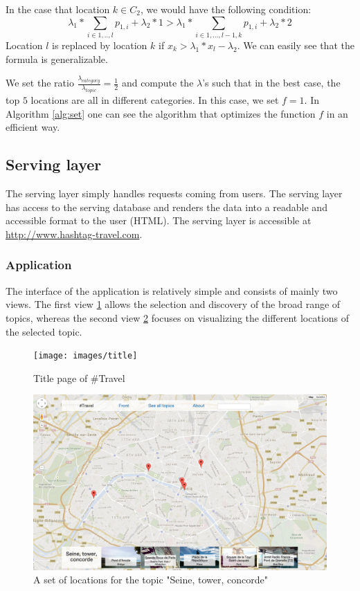 In the case that location $k \in C_2$, we would have the following condition:
\[
  \lambda_1 * \sum_{i \in 1,..,l}{p_{1,i}} + \lambda_2 * 1 > \lambda_1 * \sum_{i \in 1,...,l-1,k}{p_{1,i}} + \lambda_2 * 2
\]
Location $l$ is replaced by location $k$ if $x_k > \lambda_1 * x_l - \lambda_2$. We can easily see that the formula is generalizable.

We set the ratio $\frac{\lambda_{category}}{\lambda_{topic}} = \frac{1}{2}$ and compute the $\lambda$'s such that in the best case, the top $5$ locations are all in different categories. In this case, we set $f = 1$. In Algorithm \ref{alg:set} one can see the algorithm that optimizes the function $f$ in an efficient way.

\subsection{Serving layer}

The serving layer simply handles requests coming from users. The serving layer has access to the serving database and renders the data into a readable and accessible format to the user (HTML). The serving layer is accessible at \url{http://www.hashtag-travel.com}.

\subsubsection{Application}

The interface of the application is relatively simple and consists of mainly two views. The first view \ref{fig:title} allows the selection and discovery of the broad range of topics, whereas the second view \ref{fig:map} focuses on visualizing the different locations of the selected topic.

\begin{figure}[h!]
  \centering
    \texttt{[image: images/title]}
  \caption{Title page of \#Travel}
  \label{fig:title}
\end{figure}

\begin{figure}[h!]
  \centering
    \includegraphics[width=1\textwidth]{images/map}
  \caption{A set of locations for the topic "Seine, tower, concorde"}
  \label{fig:map}
\end{figure}

